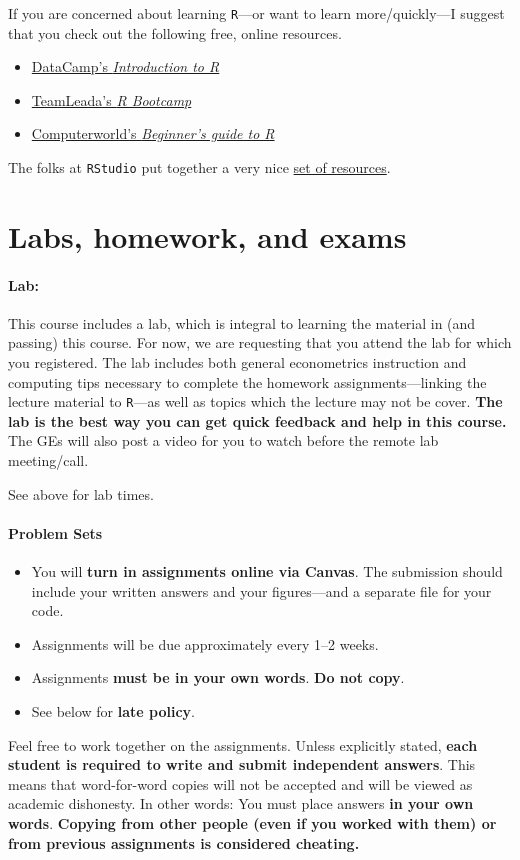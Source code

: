 \documentclass[10pt]{article}
\begin{document}
If you are concerned about learning \texttt{R}---or want to learn more/quickly---I suggest that you check out the following free, online resources.
\begin{itemize}
  \item \href{https://www.datacamp.com/courses/free-introduction-to-r}{DataCamp's \textit{Introduction to R}}
  \item \href{https://www.teamleada.com/courses/r-bootcamp}{TeamLeada's \textit{R Bootcamp}}
  \item \href{https://www.computerworld.com/article/2497143/business-intelligence-beginner-s-guide-to-r-introduction.html}{Computerworld's \textit{Beginner's guide to R}}
\end{itemize}
The folks at \texttt{RStudio} put together a very nice \href{https://education.rstudio.com/learn/beginner/}{set of resources}.

\section*{Labs, homework, and exams}

\paragraph{Lab:} This course includes a lab, which is integral to learning the material in (and passing) this course. For now, we are requesting that you attend the lab for which you registered. The lab includes both general econometrics instruction and computing tips necessary to complete the homework assignments---linking the lecture material to \texttt{R}---as well as topics which the lecture may not be cover. \textbf{The lab is the best way you can get quick feedback and help in this course.} The GEs will also post a video for you to watch before the remote lab meeting/call.

See above for lab times.

\paragraph{Problem Sets}
\begin{itemize}
  \item You will \textbf{turn in assignments online via Canvas}. The submission should include your written answers and your figures---and a separate file for your code.
  \item Assignments will be due approximately every 1--2 weeks.
  \item Assignments \textbf{must be in your own words}. \textbf{Do not copy}.
  \item See below for \textbf{late policy}.
\end{itemize}
Feel free to work together on the assignments. Unless explicitly stated, \textbf{each student is required to write and submit independent answers}. This means that word-for-word copies will not be accepted and will be viewed as academic dishonesty. In other words: You must place answers \textbf{in your own words}. \textbf{Copying from other people (even if you worked with them) or from previous assignments is considered cheating.}
\end{document}
